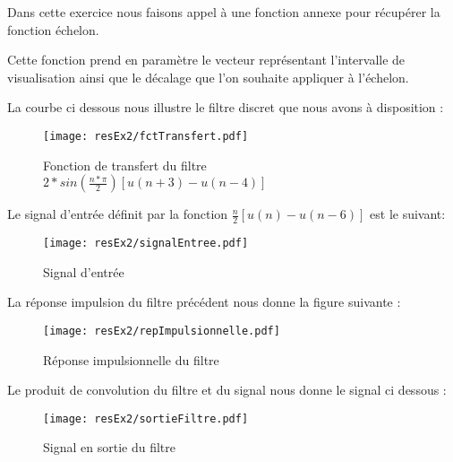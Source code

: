 Dans cette exercice nous faisons appel à une fonction annexe pour récupérer la fonction échelon.

Cette fonction prend en paramètre le vecteur représentant l'intervalle de visualisation ainsi que le décalage que l'on souhaite appliquer à l'échelon.

La courbe ci dessous nous illustre le filtre discret que nous avons à disposition :

\begin{figure}[H]
\centering
\texttt{[image: resEx2/fctTransfert.pdf]}
\caption{Fonction de transfert du filtre $2*sin(\frac{n*\pi}{2})[u(n+3)-u(n-4)]$}
\end{figure}

Le signal d'entrée définit par la fonction $\frac{n}{2}[u(n)-u(n-6)]$ est le suivant:

\begin{figure}[H]
\centering
\texttt{[image: resEx2/signalEntree.pdf]}
\caption{Signal d'entrée}
\end{figure}

La réponse impulsion du filtre précédent nous donne la figure suivante : 

\begin{figure}[H]
\centering
\texttt{[image: resEx2/repImpulsionnelle.pdf]}
\caption{Réponse impulsionnelle du filtre}
\end{figure}

Le produit de convolution du filtre et du signal nous donne le signal ci dessous :

\begin{figure}[H]
\centering
\texttt{[image: resEx2/sortieFiltre.pdf]}
\caption{Signal en sortie du filtre}
\end{figure}

